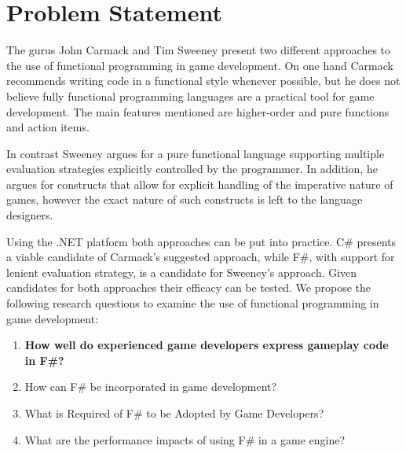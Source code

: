 \section{Problem Statement} \label{sec:problem_statement}
The gurus John Carmack and Tim Sweeney present two different approaches to the use of functional programming in game development. On one hand Carmack recommends writing code in a functional style whenever possible, but he does not believe fully functional programming languages are a practical tool for game development. The main features mentioned are higher-order and pure functions and action items.

In contrast Sweeney argues for a pure functional language supporting multiple evaluation strategies explicitly controlled by the programmer. In addition, he argues for constructs that allow for explicit handling of the imperative nature of games, however the exact nature of such constructs is left to the language designers.

Using the .NET platform both approaches can be put into practice. C\# presents a viable candidate of Carmack's suggested approach, while F\#, with support for lenient evaluation strategy, is a candidate for Sweeney's approach. Given candidates for both approaches their efficacy can be tested. We propose the following research questions to examine the use of functional programming in game development:

\begin{center}
    \begin{enumerate}
        \item \textbf{How well do experienced game developers express gameplay code in F\#?}
        \item How can F\# be incorporated in game development?
        \item What is Required of F\# to be Adopted by Game Developers?
        \item What are the performance impacts of using F\# in a game engine?
    \end{enumerate}
\end{center}
